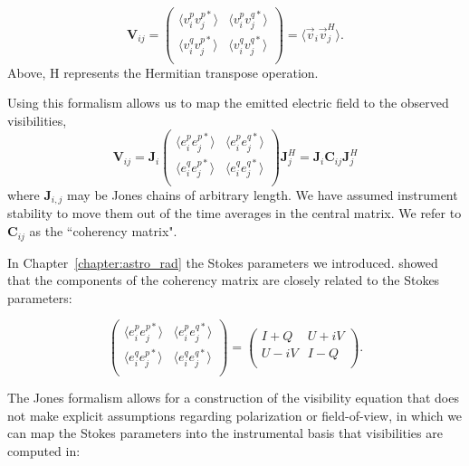 \begin{equation}
\textbf{V}_{ij} = \begin{pmatrix} 
\langle v^p_i v^{p*}_j \rangle & \langle v^p_i v^{q*}_j \rangle \\
\langle v^q_i v^{p*}_j \rangle & \langle v^q_i v^{q*}_j \rangle \\
 \end{pmatrix} = \langle \vec{v}_i \vec{v}^H_j \rangle.
\end{equation}
Above, H represents the Hermitian transpose operation.

Using this formalism allows us to map the emitted electric field to the observed visibilities, 
\begin{equation}
\textbf{V}_{ij} = \textbf{J}_i \begin{pmatrix} 
\langle e^p_i e^{p*}_j \rangle & \langle e^p_i e^{q*}_j \rangle \\
\langle e^q_i e^{p*}_j \rangle & \langle e^q_i e^{q*}_j \rangle \\
 \end{pmatrix} \textbf{J}^H_j = \textbf{J}_i \textbf{C}_{ij} \textbf{J}^H_j
\end{equation}
where \textbf{J}$_{i,j}$ may be Jones chains of arbitrary length. We have assumed instrument stability to move them out of the time averages in the central matrix. We refer to $\textbf{C}_{ij}$ as the ``coherency matrix". 

In Chapter~\ref{chapter:astro_rad} the Stokes parameters we introduced. \cite{Hamaker-Bregman.96} showed that the components of the coherency matrix are closely related to the Stokes parameters:

\begin{equation}
\begin{pmatrix} 
\langle e^p_i e^{p*}_j \rangle & \langle e^p_i e^{q*}_j \rangle \\
\langle e^q_i e^{p*}_j \rangle & \langle e^q_i e^{q*}_j \rangle \\
 \end{pmatrix}
 =
 \begin{pmatrix} 
I + Q & U + iV \\
U - iV & I - Q \\
 \end{pmatrix}.
 \label{eq:interferometry-stokes-coherency}
\end{equation}

The Jones formalism allows for a construction of the visibility equation that does not make explicit assumptions regarding polarization or field-of-view, in which we can map the Stokes parameters into the instrumental basis that visibilities are computed in:

